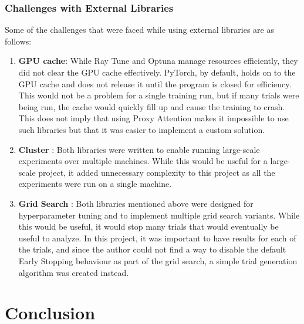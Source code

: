 \documentclass[a4paper,11pt,openright]{book}
\begin{document}
\subsection{Challenges with External Libraries} \label{sec:challenges_with_external_libraries}
Some of the challenges that were faced while using external libraries are as follows:
\begin{enumerate}
    \item \textbf{GPU cache}: While Ray Tune and Optuna manage resources efficiently, they did not clear the GPU cache effectively. PyTorch, by default, holds on to the GPU cache and does not release it until the program is closed for efficiency. This would not be a problem for a single training run, but if many trials were being run, the cache would quickly fill up and cause the training to crash. This does not imply that using Proxy Attention makes it impossible to use such libraries but that it was easier to implement a custom solution.
    \item \textbf{Cluster} : Both libraries were written to enable running large-scale experiments over multiple machines. While this would be useful for a large-scale project, it added unnecessary complexity to this project as all the experiments were run on a single machine.
    \item \textbf{Grid Search} : Both libraries mentioned above were designed for hyperparameter tuning and to implement multiple grid search variants. While this would be useful, it would stop many trials that would eventually be useful to analyze. In this project, it was important to have results for each of the trials, and since the author could not find a way to disable the default Early Stopping behaviour as part of the grid search, a simple trial generation algorithm was created instead.
\end{enumerate}

\chapter{Conclusion} \label{ch:conclusion}
\end{document}
